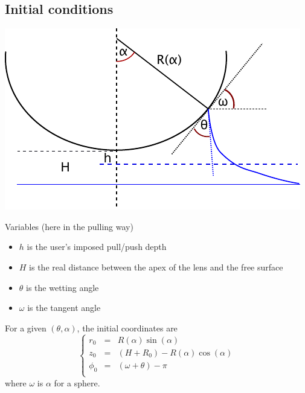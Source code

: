 \documentclass[aps,onecolumn]{revtex4}
\begin{document}
\subsection{Initial conditions}

\begin{center}
\includegraphics{pull.pdf}
\end{center}

Variables (here in the pulling way)
\begin{itemize}
	\item $h$ is the user's imposed pull/push depth
	\item $H$ is the real distance between the apex of the lens and the free surface
	\item $\theta$ is the wetting angle
	\item $\omega$ is the tangent angle
\end{itemize}

For a given $(\theta,\alpha)$, the initial coordinates are
\begin{equation}
\left\lbrace
\begin{array}{rcl}
	r_0    & = & R(\alpha) \sin(\alpha)\\
	z_0    & = & (H + R_0) - R(\alpha) \cos(\alpha)\\
	\phi_0 & = & \left(\omega + \theta\right) - \pi\\
\end{array}
\right. 
\end{equation}
where $\omega$ is $\alpha$ for a sphere.\\
\end{document}
